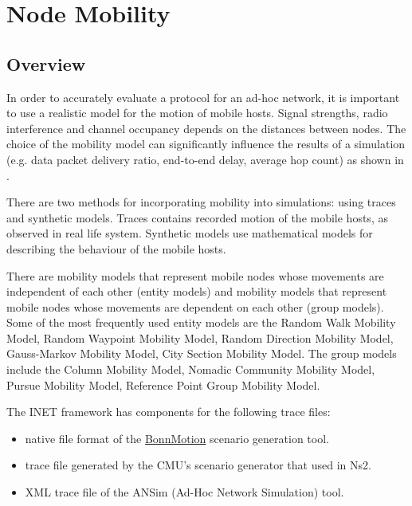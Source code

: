 
\chapter{Node Mobility}
\label{cha:mobility}


\section{Overview}

In order to accurately evaluate a protocol for an ad-hoc network,
it is important to use a realistic model for the motion of mobile
hosts. Signal strengths, radio interference and channel occupancy
depends on the distances between nodes. The choice of the mobility
model can significantly influence the results of a simulation
(e.g. data packet delivery ratio, end-to-end delay, average hop count)
as shown in \cite{Camp02asurvey}.

There are two methods for incorporating mobility into simulations:
using traces and synthetic models. Traces contains recorded motion
of the mobile hosts, as observed in real life system. Synthetic models
use mathematical models for describing the behaviour of the mobile hosts.

There are mobility models that represent mobile nodes whose movements 
are independent of each other (entity models) and mobility models
that represent mobile nodes whose movements are dependent on each other
(group models). Some of the most frequently used entity models are the
Random Walk Mobility Model, Random Waypoint Mobility Model, Random
Direction Mobility Model, Gauss-Markov Mobility Model, City Section
Mobility Model. The group models include the Column Mobility Model,
Nomadic Community Mobility Model, Pursue Mobility Model,
Reference Point Group Mobility Model.

The INET framework has components for the following trace files:

\begin{itemize}
\item {} native file format of the 
    \href{http://net.cs.uni-bonn.de/wg/cs/applications/bonnmotion/}{BonnMotion}
    scenario generation tool.
\item {} trace file generated by the CMU's scenario generator that used in Ns2.
\item {} XML trace file of the ANSim (Ad-Hoc Network Simulation) tool.
\end{itemize}

